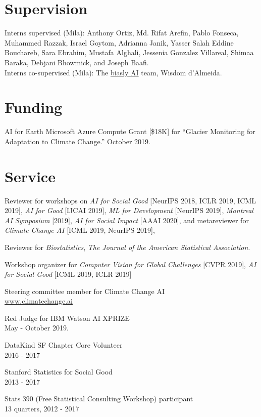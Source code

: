 \documentclass[letterpaper]{article}
\renewenvironment{itemize}{
  \begin{list}{}{
    \setlength{\leftmargin}{1.5em}
  }
}{
  \end{list}
}
\begin{document}
\section*{Supervision}
Interns supervised (Mila): Anthony Ortiz, Md. Rifat Arefin, Pablo Fonseca, Muhammed Razzak, Israel Goytom, Adrianna Janik, Yasser Salah Eddine Bouchareb, Sara Ebrahim, Mustafa Alghali, Jessenia Gonzalez Villareal, Shimaa Baraka, Debjani Bhowmick, and Joseph Baafi. \\
Interns co-supervised (Mila): The \href{https://sites.google.com/view/biaslyai/home}{biasly AI} team, Wisdom d'Almeida.

\section*{Funding}
AI for Earth Microsoft Azure Compute Grant [\$18K] for
``Glacier Monitoring for Adaptation to Climate Change.'' October 2019.

\section*{Service}

\begin{itemize}
\item Reviewer for workshops on \textit{AI for Social Good} [NeurIPS 2018, ICLR 2019, ICML 2019], \textit{AI for Good} [IJCAI 2019], \textit{ML for Development} [NeurIPS 2019], \textit{Montreal AI Symposium} [2019], \textit{AI for Social Impact} [AAAI 2020], and metareviewer for \textit{Climate Change AI} [ICML 2019, NeurIPS 2019],
\item Reviewer for \textit{Biostatistics}, \textit{The Journal of the American Statistical Association}.
\item Workshop organizer for \textit{Computer Vision for Global Challenges} [CVPR 2019], \textit{AI for Social Good} [ICML 2019, ICLR 2019]
\item  Steering committee member for Climate Change AI \\ \href{https://www.climatechange.ai}{www.climatechange.ai}
\item Red Judge for IBM Watson AI XPRIZE \\
May - October 2019.
\item DataKind SF Chapter Core Volunteer \\
  2016 - 2017
\item Stanford Statistics for Social Good \\
  2013 - 2017
\item Stats 390 (Free Statistical Consulting Workshop) participant \\
  13 quarters, 2012 - 2017
\end{itemize}
\end{document}
